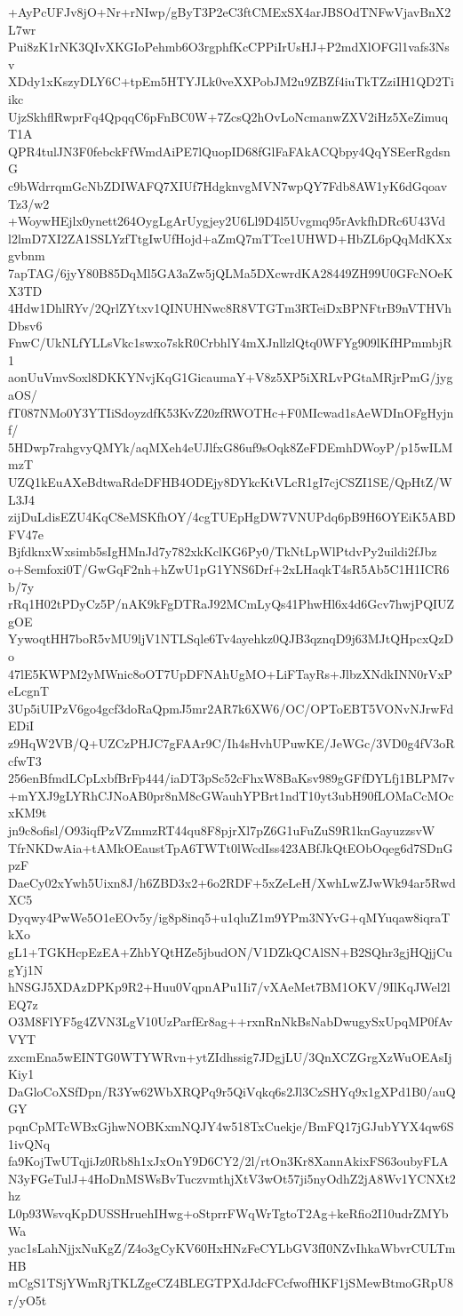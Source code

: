 +AyPcUFJv8jO+Nr+rNIwp/gByT3P2eC3ftCMExSX4arJBSOdTNFwVjavBnX2L7wr
Pui8zK1rNK3QIvXKGIoPehmb6O3rgphfKcCPPiIrUsHJ+P2mdXlOFGl1vafs3Nsv
XDdy1xKszyDLY6C+tpEm5HTYJLk0veXXPobJM2u9ZBZf4iuTkTZziIH1QD2Tiikc
UjzSkhflRwprFq4QpqqC6pFnBC0W+7ZcsQ2hOvLoNcmanwZXV2iHz5XeZimuqT1A
QPR4tulJN3F0febckFfWmdAiPE7lQuopID68fGlFaFAkACQbpy4QqYSEerRgdsnG
c9bWdrrqmGcNbZDIWAFQ7XIUf7HdgknvgMVN7wpQY7Fdb8AW1yK6dGqoavTz3/w2
+WoywHEjlx0ynett264OygLgArUygjey2U6Ll9D4l5Uvgmq95rAvkfhDRc6U43Vd
l2lmD7XI2ZA1SSLYzfTtgIwUfHojd+aZmQ7mTTce1UHWD+HbZL6pQqMdKXxgvbnm
7apTAG/6jyY80B85DqMl5GA3aZw5jQLMa5DXcwrdKA28449ZH99U0GFcNOeKX3TD
4Hdw1DhlRYv/2QrlZYtxv1QINUHNwc8R8VTGTm3RTeiDxBPNFtrB9nVTHVhDbsv6
FnwC/UkNLfYLLsVkc1swxo7skR0CrbhlY4mXJnllzlQtq0WFYg909lKfHPmmbjR1
aonUuVmvSoxl8DKKYNvjKqG1GicaumaY+V8z5XP5iXRLvPGtaMRjrPmG/jygaOS/
fT087NMo0Y3YTIiSdoyzdfK53KvZ20zfRWOTHc+F0MIcwad1sAeWDInOFgHyjnf/
5HDwp7rahgvyQMYk/aqMXeh4eUJlfxG86uf9sOqk8ZeFDEmhDWoyP/p15wILMmzT
UZQ1kEuAXeBdtwaRdeDFHB4ODEjy8DYkcKtVLcR1gI7cjCSZI1SE/QpHtZ/WL3J4
zijDuLdisEZU4KqC8eMSKfhOY/4cgTUEpHgDW7VNUPdq6pB9H6OYEiK5ABDFV47e
BjfdknxWxsimb5sIgHMnJd7y782xkKclKG6Py0/TkNtLpWlPtdvPy2uildi2fJbz
o+Semfoxi0T/GwGqF2nh+hZwU1pG1YNS6Drf+2xLHaqkT4sR5Ab5C1H1ICR6b/7y
rRq1H02tPDyCz5P/nAK9kFgDTRaJ92MCmLyQs41PhwHl6x4d6Gcv7hwjPQIUZgOE
YywoqtHH7boR5vMU9ljV1NTLSqle6Tv4ayehkz0QJB3qznqD9j63MJtQHpcxQzDo
47lE5KWPM2yMWnic8oOT7UpDFNAhUgMO+LiFTayRs+JlbzXNdkINN0rVxPeLcgnT
3Up5iUIPzV6go4gcf3doRaQpmJ5mr2AR7k6XW6/OC/OPToEBT5VONvNJrwFdEDiI
z9HqW2VB/Q+UZCzPHJC7gFAAr9C/Ih4sHvhUPuwKE/JeWGc/3VD0g4fV3oRcfwT3
256enBfmdLCpLxbfBrFp444/iaDT3pSc52cFhxW8BaKsv989gGFfDYLfj1BLPM7v
+mYXJ9gLYRhCJNoAB0pr8nM8cGWauhYPBrt1ndT10yt3ubH90fLOMaCcMOcxKM9t
jn9c8ofisl/O93iqfPzVZmmzRT44qu8F8pjrXl7pZ6G1uFuZuS9R1knGayuzzsvW
TfrNKDwAia+tAMkOEaustTpA6TWTt0lWcdIss423ABfJkQtEObOqeg6d7SDnGpzF
DaeCy02xYwh5Uixn8J/h6ZBD3x2+6o2RDF+5xZeLeH/XwhLwZJwWk94ar5RwdXC5
Dyqwy4PwWe5O1eEOv5y/ig8p8inq5+u1qluZ1m9YPm3NYvG+qMYuqaw8iqraTkXo
gL1+TGKHcpEzEA+ZhbYQtHZe5jbudON/V1DZkQCAlSN+B2SQhr3gjHQjjCugYj1N
hNSGJ5XDAzDPKp9R2+Huu0VqpnAPu1Ii7/vXAeMet7BM1OKV/9IlKqJWel2lEQ7z
O3M8FlYF5g4ZVN3LgV10UzParfEr8ag++rxnRnNkBsNabDwugySxUpqMP0fAvVYT
zxcmEna5wEINTG0WTYWRvn+ytZIdhssig7JDgjLU/3QnXCZGrgXzWuOEAsIjKiy1
DaGloCoXSfDpn/R3Yw62WbXRQPq9r5QiVqkq6s2Jl3CzSHYq9x1gXPd1B0/auQGY
pqnCpMTcWBxGjhwNOBKxmNQJY4w518TxCuekje/BmFQ17jGJubYYX4qw6S1ivQNq
fa9KojTwUTqjiJz0Rb8h1xJxOnY9D6CY2/2l/rtOn3Kr8XannAkixFS63oubyFLA
N3yFGeTulJ+4HoDnMSWsBvTuczvmthjXtV3wOt57ji5nyOdhZ2jA8Wv1YCNXt2hz
L0p93WsvqKpDUSSHruehIHwg+oStprrFWqWrTgtoT2Ag+keRfio2I10udrZMYbWa
yac1sLahNjjxNuKgZ/Z4o3gCyKV60HxHNzFeCYLbGV3fI0NZvIhkaWbvrCULTmHB
mCgS1TSjYWmRjTKLZgeCZ4BLEGTPXdJdcFCcfwofHKF1jSMewBtmoGRpU8r/yO5t
